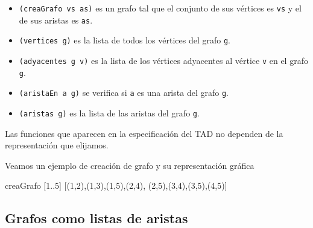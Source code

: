\begin{itemize}
\item \texttt{(creaGrafo vs as)} es un grafo tal que el conjunto de sus
  vértices  es \texttt{vs} y el de sus aristas es \texttt{as}.
\item \texttt{(vertices g)} es la lista de todos los vértices del 
  grafo \texttt{g}.
\item \texttt{(adyacentes g v)} es la lista de los vértices adyacentes
  al vértice
  \texttt{v} en el grafo \texttt{g}.
\item \texttt{(aristaEn a g)} se verifica si \texttt{a} es una arista del grafo
  \texttt{g}.
\item \texttt{(aristas g)} es la lista de las aristas del grafo \texttt{g}.
\end{itemize}

\begin{nota}
  Las funciones que aparecen en la especificación del TAD no dependen 
  de la representación que elijamos.
\end{nota}

\begin{ejemplo}

Veamos un ejemplo de creación de grafo y su representación gráfica

\begin{code}
creaGrafo [1..5] [(1,2),(1,3),(1,5),(2,4),
                  (2,5),(3,4),(3,5),(4,5)]
\end{code}

\begin{center}
\end{center}
\end{ejemplo}

\subsection{Grafos como listas de aristas}


